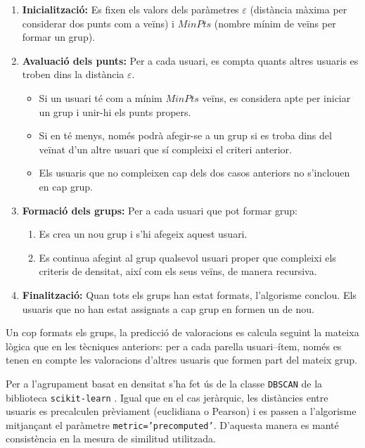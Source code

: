 \documentclass[a4paper,12pt]{report}
\begin{document}
\begin{enumerate}
    \item \textbf{Inicialització:} Es fixen els valors dels paràmetres \(\varepsilon\) (distància màxima per considerar dos punts com a veïns) i \(\mathit{MinPts}\) (nombre mínim de veïns per formar un grup).
    
    \item \textbf{Avaluació dels punts:} Per a cada usuari, es compta quants altres usuaris es troben dins la distància \(\varepsilon\).
    \begin{itemize}
        \item Si un usuari té com a mínim \(\mathit{MinPts}\) veïns, es considera apte per iniciar un grup i unir-hi els punts propers.
        \item Si en té menys, només podrà afegir-se a un grup si es troba dins del veïnat d’un altre usuari que sí compleixi el criteri anterior.
        \item Els usuaris que no compleixen cap dels dos casos anteriors no s’inclouen en cap grup.
    \end{itemize}
    
    \item \textbf{Formació dels grups:} Per a cada usuari que pot formar grup:
    \begin{enumerate}
        \item Es crea un nou grup i s’hi afegeix aquest usuari.
        \item Es continua afegint al grup qualsevol usuari proper que compleixi els criteris de densitat, així com els seus veïns, de manera recursiva.
    \end{enumerate}
    
    \item \textbf{Finalització:} Quan tots els grups han estat formats, l’algorisme conclou. Els usuaris que no han estat assignats a cap grup en formen un de nou.
\end{enumerate}

Un cop formats els grups, la predicció de valoracions es calcula seguint la mateixa lògica que en les tècniques anteriors: per a cada parella usuari–ítem, només es tenen en compte les valoracions d’altres usuaris que formen part del mateix grup.

Per a l’agrupament basat en densitat s'ha fet ús de la classe \texttt{DBSCAN} de la biblioteca \texttt{scikit-learn} \cite{pedregosa2011scikit}. Igual que en el cas jeràrquic, les distàncies entre usuaris es precalculen prèviament (euclidiana o Pearson) i es passen a l’algorisme mitjançant el paràmetre \texttt{metric='precomputed'}. D’aquesta manera es manté consistència en la mesura de similitud utilitzada.
\end{document}
